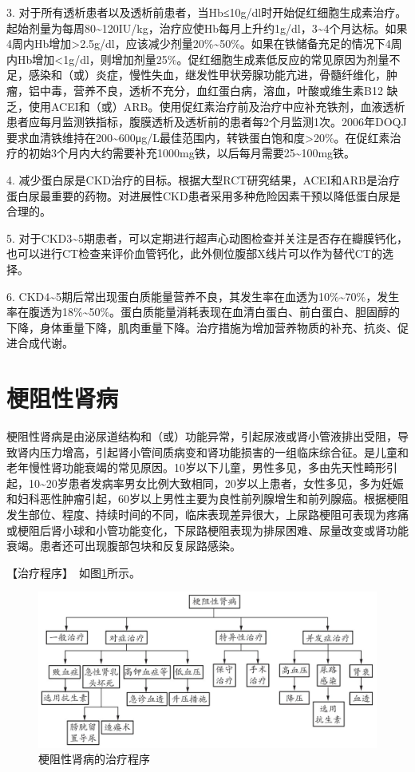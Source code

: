 3.
对于所有透析患者以及透析前患者，当Hb≤10g/dl时开始促红细胞生成素治疗。起始剂量为每周80\textasciitilde{}120IU/kg，治疗应使Hb每月上升约1g/dl，3\textasciitilde{}4个月达标。如果4周内Hb增加\textgreater{}2.5g/dl，应该减少剂量20\%\textasciitilde{}50\%。如果在铁储备充足的情况下4周内Hb增加\textless{}1g/dl，则增加剂量25\%。促红细胞生成素低反应的常见原因为剂量不足，感染和（或）炎症，慢性失血，继发性甲状旁腺功能亢进，骨髓纤维化，肿瘤，铝中毒，营养不良，透析不充分，血红蛋白病，溶血，叶酸或维生素B{12}
缺乏，使用ACEI和（或）ARB。使用促红素治疗前及治疗中应补充铁剂，血液透析患者应每月监测铁指标，腹膜透析及透析前的患者每2个月监测1次。2006年DOQJ要求血清铁维持在200\textasciitilde{}600μg/L最佳范围内，转铁蛋白饱和度\textgreater{}20\%。在促红素治疗的初始3个月内大约需要补充1000mg铁，以后每月需要25\textasciitilde{}100mg铁。

4.
减少蛋白尿是CKD治疗的目标。根据大型RCT研究结果，ACEI和ARB是治疗蛋白尿最重要的药物。对进展性CKD患者采用多种危险因素干预以降低蛋白尿是合理的。

5.
对于CKD3\textasciitilde{}5期患者，可以定期进行超声心动图检查并关注是否存在瓣膜钙化，也可以进行CT检查来评价血管钙化，此外侧位腹部X线片可以作为替代CT的选择。

6.
CKD4\textasciitilde{}5期后常出现蛋白质能量营养不良，其发生率在血透为10\%\textasciitilde{}70\%，发生率在腹透为18\%\textasciitilde{}50\%。蛋白质能量消耗表现在血清白蛋白、前白蛋白、胆固醇的下降，身体重量下降，肌肉重量下降。治疗措施为增加营养物质的补充、抗炎、促进合成代谢。

\section{梗阻性肾病}

梗阻性肾病是由泌尿道结构和（或）功能异常，引起尿液或肾小管液排出受阻，导致肾内压力增高，引起肾小管间质病变和肾功能损害的一组临床综合征。是儿童和老年慢性肾功能衰竭的常见原因。10岁以下儿童，男性多见，多由先天性畸形引起，10\textasciitilde{}20岁患者发病率男女比例大致相同，20岁以上患者，女性多见，多为妊娠和妇科恶性肿瘤引起，60岁以上男性主要为良性前列腺增生和前列腺癌。根据梗阻发生部位、程度、持续时间的不同，临床表现差异很大，上尿路梗阻可表现为疼痛或梗阻后肾小球和小管功能变化，下尿路梗阻表现为排尿困难、尿量改变或肾功能衰竭。患者还可出现腹部包块和反复尿路感染。

【治疗程序】　如图\ref{fig4-9-1}所示。

\begin{figure}[!htbp]
 \centering
 \includegraphics{./images/Image00132.jpg}
 \captionsetup{justification=centering}
 \caption{梗阻性肾病的治疗程序}
 \label{fig4-9-1}
  \end{figure} 

